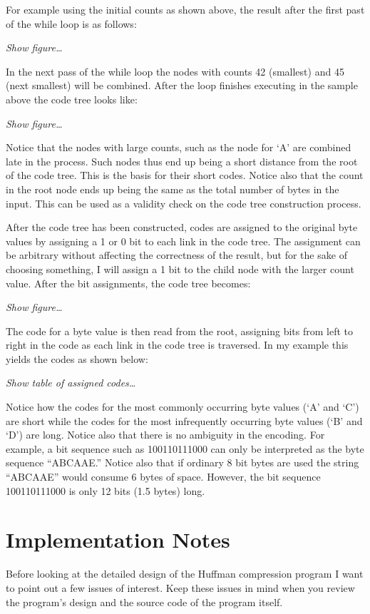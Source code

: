 \documentclass{scrreprt}
\begin{document}
For example using the initial counts as shown above, the result after the first past of the
while loop is as follows:

\textit{Show figure\ldots}

In the next pass of the while loop the nodes with counts 42 (smallest) and 45 (next smallest)
will be combined. After the loop finishes executing in the sample above the code tree looks
like:

\textit{Show figure\ldots}

Notice that the nodes with large counts, such as the node for `A' are combined late in the
process. Such nodes thus end up being a short distance from the root of the code tree. This is
the basis for their short codes. Notice also that the count in the root node ends up being the
same as the total number of bytes in the input. This can be used as a validity check on the code
tree construction process.

After the code tree has been constructed, codes are assigned to the original byte values by
assigning a 1 or 0 bit to each link in the code tree. The assignment can be arbitrary without
affecting the correctness of the result, but for the sake of choosing something, I will assign a
1 bit to the child node with the larger count value.  After the bit assignments, the code tree
becomes:

\textit{Show figure\ldots}

The code for a byte value is then read from the root, assigning bits from left to right in the
code as each link in the code tree is traversed. In my example this yields the codes as shown
below:

\textit{Show table of assigned codes\ldots}

Notice how the codes for the most commonly occurring byte values (`A' and `C') are short while
the codes for the most infrequently occurring byte values (`B' and `D') are long. Notice also
that there is no ambiguity in the encoding. For example, a bit sequence such as 100110111000 can
only be interpreted as the byte sequence ``ABCAAE.'' Notice also that if ordinary 8 bit bytes
are used the string ``ABCAAE'' would consume 6 bytes of space. However, the bit sequence
100110111000 is only 12 bits (1.5 bytes) long.

\section{Implementation Notes}

Before looking at the detailed design of the Huffman compression program I want to point out a
few issues of interest. Keep these issues in mind when you review the program's design and the
source code of the program itself.
\end{document}
